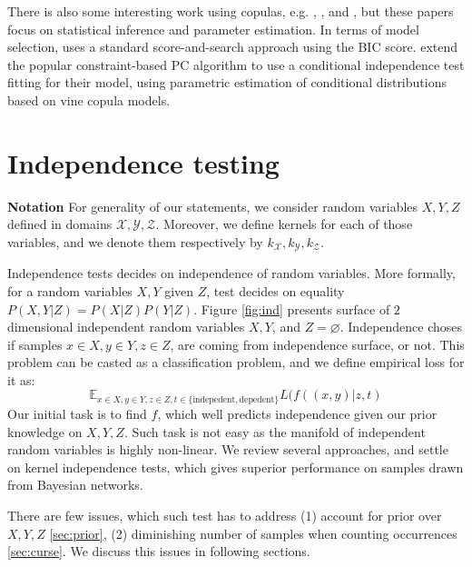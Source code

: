 \documentclass{article} %
\begin{document}
There is also some interesting work using copulas, e.g. \cite{hanea2006hybrid}, \cite{hanea2008mixed}, and \cite{hanea2010mining}, but these papers focus on statistical inference and parameter estimation.  In terms of model selection, \cite{elidan2010copula} uses a standard score-and-search approach using the BIC score.  \cite{bauer2012pair} extend the popular constraint-based PC algorithm to use a conditional independence test fitting for their model, using parametric estimation of conditional distributions based on vine copula models.

\section{Independence testing} 
{\bf Notation} 
For generality of our statements, we consider random variables $X, Y, Z$ defined in domains $\mathcal{X}, \mathcal{Y}, \mathcal{Z}$. Moreover,
we define kernels for each of those variables, and we denote them respectively by $k_{\mathcal{X}}, k_{\mathcal{Y}}, k_{\mathcal{Z}}$.


Independence tests decides on independence of random variables. More formally,
for a random variables $X, Y$ given $Z$, test decides on equality $P(X, Y| Z) = P(X | Z) P(Y | Z)$. 
Figure \ref{fig:ind} presents surface of $2$ dimensional independent 
random variables $X, Y$, and $Z = \varnothing$. Independence choses if samples $x \in X, y \in Y, z \in Z$, 
are coming from independence surface, or not. 
This problem can be casted as a classification problem, and we define
empirical loss for it as:
\begin{equation}
  \mathbb{E}_{x \in X, y \in Y, z \in Z, t \in \{\text{indepedent}, \text{depedent}\}} L(f((x, y)|z, t)
\end{equation}
Our initial task is to find $f$, which well predicts independence given our prior
knowledge on $X, Y, Z$. Such task is not easy as the manifold of independent
random variables is highly non-linear. We review several approaches, and 
settle on kernel independence tests, which gives superior performance on
samples drawn from Bayesian networks.


There are few issues, which such test has to address 
(1) account for prior over $X, Y, Z$ \ref{sec:prior}, (2) diminishing number of samples when
counting occurrences \ref{sec:curse}. We discuss this issues
in following sections. 
\end{document}
